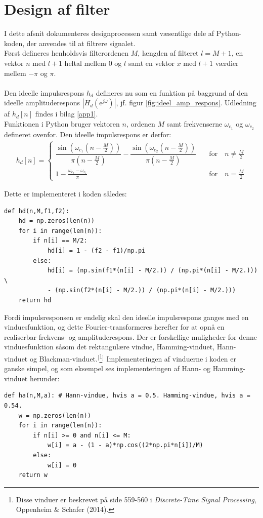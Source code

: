 \section{Design af filter} \label{ch4_design}
I dette afsnit dokumenteres designprocessen samt væsentlige dele af Python-koden, der anvendes til at filtrere signalet.\\
Først defineres henholdsvis filterordenen $M$, længden af filteret $l = M + 1$, en vektor $n$ med $l+1$ heltal mellem 0 og $l$ samt en vektor $x$ med $l+1$ værdier mellem $-\pi$ og $\pi$.
\\ \\
Den ideelle impulsrespons $h_d$ defineres nu som en funktion på baggrund af den ideelle amplituderespons $|H_d(\text{e}^{j\omega})|$, jf. figur \ref{fig:ideel_amp_respons}. Udledning af $h_d[n]$ findes i bilag \ref{app1}. \\
Funktionen i Python bruger vektoren $n$, ordenen $M$ samt frekvenserne $\omega_{c_1}$ og $\omega_{c_2}$ defineret ovenfor. Den ideelle impulsrespons er derfor:
\begin{align*}
h_d[n] = \begin{cases} \dfrac{\sin\left(\omega_{c_1}\left(n - \frac{M}{2}\right)\right)}{\pi\left(n - \frac{M}{2}\right)} - \dfrac{\sin\left(\omega_{c_2}\left(n - \frac{M}{2}\right)\right)}{\pi\left(n - \frac{M}{2}\right)} \quad &\text{for} \quad n \neq \frac{M}{2} \\
1 - \frac{\omega_{c_2} - \omega_{c_1}}{\pi} \quad &\text{for} \quad n = \frac{M}{2}
\end{cases}
\end{align*}

Dette er implementeret i koden således:
\begin{lstlisting}
def hd(n,M,f1,f2): 
    hd = np.zeros(len(n))
    for i in range(len(n)):
        if n[i] == M/2:
            hd[i] = 1 - (f2 - f1)/np.pi
        else:
            hd[i] = (np.sin(f1*(n[i] - M/2.)) / (np.pi*(n[i] - M/2.))) \
            - (np.sin(f2*(n[i] - M/2.)) / (np.pi*(n[i] - M/2.)))
    return hd
\end{lstlisting}

Fordi impulsresponsen er endelig skal den ideelle impulsrespons ganges med en vinduesfunktion, og dette Fourier-transformeres herefter for at opnå en realiserbar frekvens- og amplituderespons. Der er forskellige muligheder for denne vinduesfunktion såsom det rektangulære vindue, Hamming-vinduet, Hann-vinduet og Blackman-vinduet.$^[$\footnote{Disse vinduer er beskrevet på side 559-560 i \textit{Discrete-Time Signal Processing}, Oppenheim \& Schafer (2014).}$^]$ Implementeringen af vinduerne i koden er ganske simpel, og som eksempel ses implementeringen af Hann- og Hamming-vinduet herunder:
\begin{lstlisting}
def ha(n,M,a): # Hann-vindue, hvis a = 0.5. Hamming-vindue, hvis a = 0.54.
    w = np.zeros(len(n))
    for i in range(len(n)):
        if n[i] >= 0 and n[i] <= M:
            w[i] = a - (1 - a)*np.cos((2*np.pi*n[i])/M)
        else:
            w[i] = 0
    return w
\end{lstlisting}

